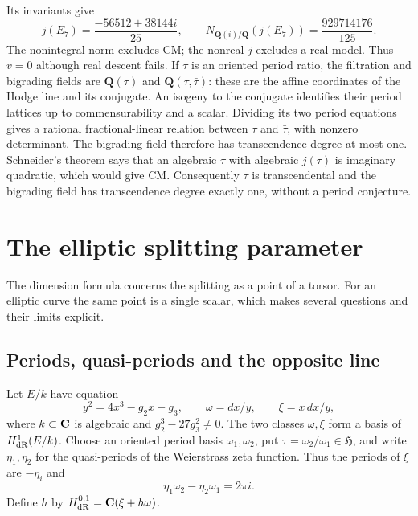 \documentclass[11pt]{article}
\theoremstyle{definition}\newtheorem{definition}[theorem]{Definition}
\theoremstyle{remark}\newtheorem{remark}[theorem]{Remark}
\newcommand{\Q}{\mathbf Q}\newcommand{\Z}{\mathbf Z}
\begin{document}
Its invariants give
\[
 j(E_7)=\frac{-56512+38144i}{25},\qquad
 N_{\Q(i)/\Q}(j(E_7))=\frac{929714176}{125}.
\]
The nonintegral norm excludes CM; the nonreal $j$ excludes a real model. Thus $v=0$ although real descent fails. If $\tau$ is an oriented period ratio, the filtration and bigrading fields are $\Q(\tau)$ and $\Q(\tau,\bar\tau)$: these are the affine coordinates of the Hodge line and its conjugate. An isogeny to the conjugate identifies their period lattices up to commensurability and a scalar. Dividing its two period equations gives a rational fractional-linear relation between $\tau$ and $\bar\tau$, with nonzero determinant. The bigrading field therefore has transcendence degree at most one. Schneider's theorem \cite[\S1, result IIc, p.~5]{Schneider} says that an algebraic $\tau$ with algebraic $j(\tau)$ is imaginary quadratic, which would give CM. Consequently $\tau$ is transcendental and the bigrading field has transcendence degree exactly one, without a period conjecture.

\section{The elliptic splitting parameter}\label{sec:elliptic-splitting}
The dimension formula concerns the splitting as a point of a torsor. For an elliptic curve the same point is a single scalar, which makes several questions and their limits explicit.

\subsection{Periods, quasi-periods and the opposite line}
Let $E/k$ have equation
\[
 y^2=4x^3-g_2x-g_3,\qquad \omega=dx/y,\qquad \xi=x\,dx/y,
\]
where $k\subset\mathbf C$ is algebraic and $g_2^3-27g_3^2\ne0$. The two classes $\omega,\xi$ form a basis of $H^1_{\mathrm{dR}}(E/k)$. Choose an oriented period basis $\omega_1,\omega_2$, put $\tau=\omega_2/\omega_1\in\mathfrak H$, and write $\eta_1,\eta_2$ for the quasi-periods of the Weierstrass zeta function. Thus the periods of $\xi$ are $-\eta_i$ and
\[
 \eta_1\omega_2-\eta_2\omega_1=2\pi i.
\]
Define $h$ by $H^{0,1}_{\mathrm{dR}}=\mathbf C(\xi+h\omega)$.
\end{document}
